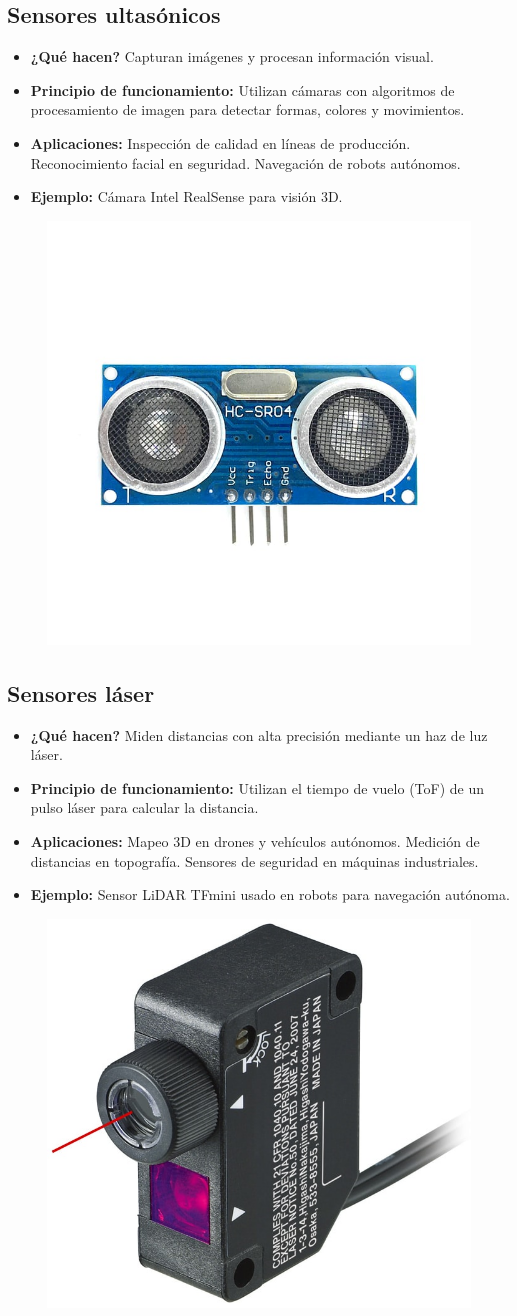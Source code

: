 \subsection*{Sensores ultasónicos}
\begin{itemize}
	\item \textbf{¿Qué hacen?} Capturan imágenes y procesan información visual.
	\item \textbf{Principio de funcionamiento:} Utilizan cámaras con algoritmos de procesamiento de imagen para detectar formas, colores y movimientos.
	\item \textbf{Aplicaciones:} Inspección de calidad en líneas de producción.
	Reconocimiento facial en seguridad.
	Navegación de robots autónomos.
	\item \textbf{Ejemplo:} Cámara Intel RealSense para visión 3D.
\end{itemize}
\begin{figure}[h]
	\centering
	\includegraphics[width=0.3\linewidth]{img/sensor ultrasonico}
	\label{fig:sensor ultrasonico}
\end{figure}
\subsection*{Sensores láser}
\begin{itemize}
	\item \textbf{¿Qué hacen?} Miden distancias con alta precisión mediante un haz de luz láser.
	\item \textbf{Principio de funcionamiento:} Utilizan el tiempo de vuelo (ToF) de un pulso láser para calcular la distancia.
	\item \textbf{Aplicaciones:} Mapeo 3D en drones y vehículos autónomos.
	Medición de distancias en topografía.
	Sensores de seguridad en máquinas industriales.
	\item \textbf{Ejemplo:} Sensor LiDAR TFmini usado en robots para navegación autónoma.
\end{itemize}
\begin{figure}[h]
	\centering
	\includegraphics[width=0.3\linewidth]{img/sensor laser}
	\label{fig:sensor laser}
\end{figure}
